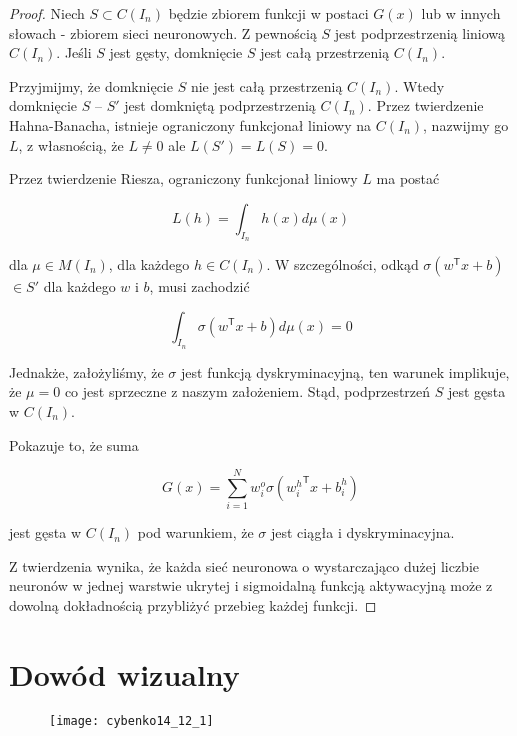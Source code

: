 \documentclass[]{article}
\theoremstyle{definition}
\begin{document}
\begin{proof}


Niech $S \subset C(I_n)$ będzie zbiorem funkcji w postaci $G(x)$ lub w innych słowach - zbiorem sieci neuronowych. Z pewnością $S$ jest podprzestrzenią liniową $C(I_n)$. Jeśli $S$ jest gęsty, domknięcie $S$ jest całą przestrzenią $C(I_n)$.

Przyjmijmy, że domknięcie $S$ nie jest całą przestrzenią $C(I_n)$. Wtedy domknięcie $S$ -- $S'$ jest domkniętą podprzestrzenią $C(I_n)$. Przez twierdzenie Hahna-Banacha, istnieje ograniczony funkcjonał liniowy na $C(I_n)$, nazwijmy go $L$, z własnością, że $L \neq 0$ ale $L(S') = L(S) = 0$.

Przez twierdzenie Riesza, ograniczony funkcjonał liniowy $L$ ma postać

$$
L(h) = \int_{I_n} h(x)d\mu(x)
$$

dla $\mu \in M(I_n)$, dla każdego $h \in C(I_n)$. W szczególności, odkąd $\sigma(w^\mathsf{T}x + b)$  $\in S'$ dla każdego $w$ i $b$, musi zachodzić

$$
\int_{I_n} \sigma \left(w^\mathsf{T}x + b \right) d\mu(x) = 0 
$$

Jednakże, założyliśmy, że $\sigma$ jest funkcją dyskryminacyjną, ten warunek implikuje, że $\mu = 0$ co jest sprzeczne z naszym założeniem. Stąd, podprzestrzeń $S$ jest gęsta w $C(I_n)$.

Pokazuje to, że suma

$$
G\left(x\right) = \sum_{i=1}^{N} w^{o}_i \sigma\left({w^h_i}^{\mathsf{T}}x + b^h_i\right)
$$

jest gęsta w $C(I_n)$ pod warunkiem, że $\sigma$ jest ciągła i dyskryminacyjna.

Z twierdzenia wynika, że każda sieć neuronowa o wystarczająco dużej liczbie neuronów w jednej warstwie ukrytej i sigmoidalną funkcją aktywacyjną może z dowolną dokładnością przybliżyć przebieg każdej funkcji.

\end{proof}

\newpage

\section{Dowód wizualny}

\begin{figure}[h!]
	\centering
	\texttt{[image: cybenko14\_12\_1]}

\end{figure}
\end{document}
